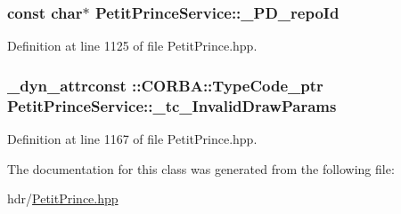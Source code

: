 \subsubsection[{\texorpdfstring{\+\_\+\+P\+D\+\_\+repo\+Id}{_PD_repoId}}]{ const char$\ast$ Petit\+Prince\+Service\+::\+\_\+\+P\+D\+\_\+repo\+Id\hspace{0.3cm}{\ttfamily [static]}}\hypertarget{class_petit_prince_service_a122c277422e3adfb04c5b3851a8b94a1}{}\label{class_petit_prince_service_a122c277422e3adfb04c5b3851a8b94a1}


Definition at line 1125 of file Petit\+Prince.\+hpp.

\subsubsection[{\texorpdfstring{\+\_\+tc\+\_\+\+Invalid\+Draw\+Params}{_tc_InvalidDrawParams}}]{\setlength{\rightskip}{0pt plus 5cm}\+\_\+dyn\+\_\+attrconst \+::C\+O\+R\+B\+A\+::\+Type\+Code\+\_\+ptr Petit\+Prince\+Service\+::\+\_\+tc\+\_\+\+Invalid\+Draw\+Params\hspace{0.3cm}{\ttfamily [static]}}\hypertarget{class_petit_prince_service_af8862791a82a5037ffebad7ab9096817}{}\label{class_petit_prince_service_af8862791a82a5037ffebad7ab9096817}


Definition at line 1167 of file Petit\+Prince.\+hpp.



The documentation for this class was generated from the following file\+:\begin{DoxyCompactItemize}
\item 
hdr/\hyperlink{_petit_prince_8hpp}{Petit\+Prince.\+hpp}\end{DoxyCompactItemize}
